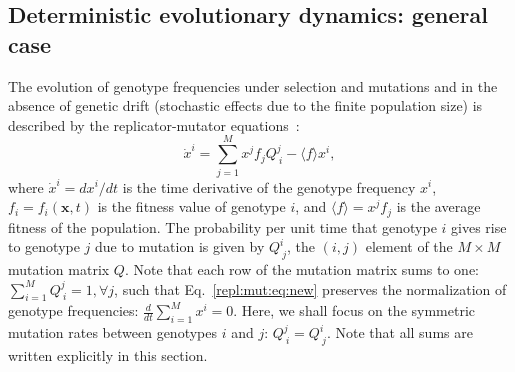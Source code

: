 \documentclass[9pt,twocolumn,twoside]{gsajnl}
\begin{document}
\subsection{Deterministic evolutionary dynamics: general case}

The evolution of genotype frequencies under selection and mutations and in the absence of genetic drift (stochastic effects due to the finite population size) is described
by the replicator-mutator equations~\citep{Page2002,Nowak2006book}:
\begin{equation} \label{repl:mut:eq:new}
\dot{x}^i = \sum_{j=1}^M x^j f_j Q^{j}_{~i} - \langle f \rangle x^i,
\end{equation}
where $\dot{x}^i = {d x^i}/{dt}$ is the time derivative of the genotype frequency $x^i$, $f_i = f_i (\mathbf{x}, t)$ is the fitness value of genotype $i$, and $\langle f \rangle = x^j f_j$ is the average fitness of the population.
The probability per unit time that genotype $i$ gives rise to genotype $j$ due to mutation is given by $Q^{i}_{~j}$, the $(i,j)$ element of the $M \times M$ mutation matrix $Q$. Note that each
row of the mutation matrix sums to one: $\sum_{i=1}^M Q^{j}_{~i} = 1, \forall j$, such that Eq.~\eqref{repl:mut:eq:new} preserves the normalization of genotype frequencies: $\frac{d}{dt} \sum_{i=1}^M x^i = 0$.
Here, we shall focus on the symmetric mutation rates between genotypes $i$ and $j$: $Q^{j}_{~i} = Q^{i}_{~j}$.
Note that all sums are written explicitly in this section.
\end{document}
